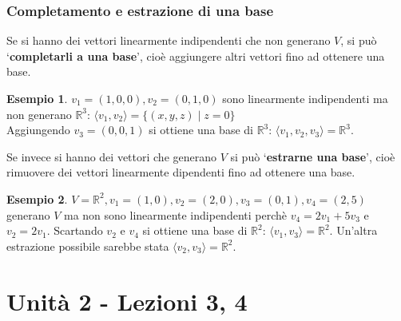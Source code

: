 \documentclass[a4paper]{article}
\theoremstyle{definition}
\newtheorem*{es}{Esempio}
\begin{document}
\subsubsection{Completamento e estrazione di una base}
Se si hanno dei vettori linearmente indipendenti che non generano $V$, si può \enquote*{\textbf{completarli a una base}}, cioè aggiungere altri vettori fino ad ottenere una base.
\begin{es}
	$v_1 = (1, 0, 0), v_2 = (0, 1, 0)$ sono linearmente indipendenti ma non generano $\mathbb{R}^3$: $\langle v_1, v_2 \rangle = \{(x, y, z) \mid z = 0\}$ \\
	Aggiungendo $v_3 = (0, 0, 1)$ si ottiene una base di $\mathbb{R}^3$: $\langle v_1, v_2, v_3 \rangle = \mathbb{R}^3$.
\end{es}
Se invece si hanno dei vettori che generano $V$ si può \enquote*{\textbf{estrarne una base}}, cioè rimuovere dei vettori linearmente dipendenti fino ad ottenere una base.
\begin{es}
	$V = \mathbb{R}^2, v_1 = (1, 0), v_2 = (2, 0), v_3 = (0, 1), v_4 = (2, 5)$ generano $V$ ma non sono linearmente indipendenti perchè $v_4 = 2v_1 + 5v_3$ e $v_2 = 2v_1$.
	Scartando $v_2$ e $v_4$ si ottiene una base di $\mathbb{R}^2$: $\langle v_1, v_3 \rangle = \mathbb{R}^2$.
	Un'altra estrazione possibile sarebbe stata $\langle v_2, v_3 \rangle = \mathbb{R}^2$.
\end{es}

\section{Unità 2 - Lezioni 3, 4}
\end{document}
